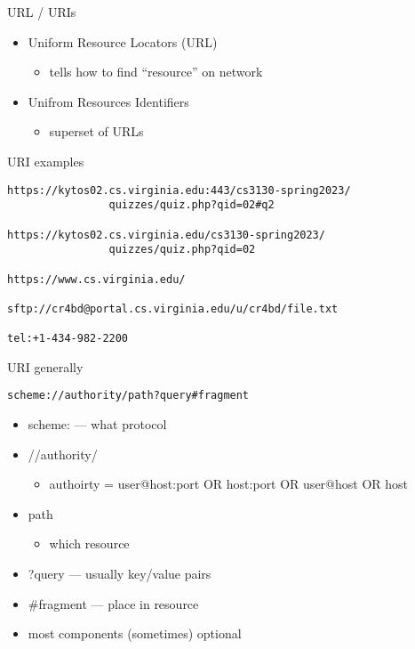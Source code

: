 \begin{frame}{URL / URIs}
\begin{itemize}
\item Uniform Resource Locators (URL)
    \begin{itemize}
    \item tells how to find ``resource'' on network
    \end{itemize}
\item Unifrom Resources Identifiers
    \begin{itemize}
    \item superset of URLs
    \end{itemize}
\end{itemize}
\end{frame}

\begin{frame}[fragile]{URI examples}
\begin{Verbatim}[fontsize=\small]
https://kytos02.cs.virginia.edu:443/cs3130-spring2023/
                quizzes/quiz.php?qid=02#q2

https://kytos02.cs.virginia.edu/cs3130-spring2023/
                quizzes/quiz.php?qid=02

https://www.cs.virginia.edu/

sftp://cr4bd@portal.cs.virginia.edu/u/cr4bd/file.txt

tel:+1-434-982-2200
\end{Verbatim}
\end{frame}


\begin{frame}[fragile]{URI generally}
\begin{Verbatim}
scheme://authority/path?query#fragment
\end{Verbatim}
\begin{itemize}
\item scheme: --- what protocol
\item //authority/
    \begin{itemize}
    \item authoirty = user@host:port OR host:port OR user@host OR host
    \end{itemize}
\item path
    \begin{itemize}
    \item which resource
    \end{itemize}
\item ?query --- usually key/value pairs 
\item \#fragment --- place in resource
\vspace{.5cm}
\item most components (sometimes) optional
\end{itemize}
\end{frame}
